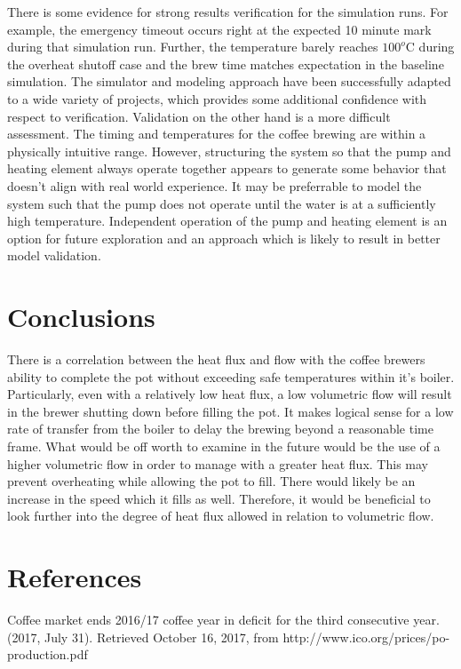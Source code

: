 \documentclass[10pt]{article}
\newcommand{\hin}{\hangindent=8mm \hangafter=1 \noindent }
\begin{document}
There is some evidence for strong results verification for the simulation runs.  For example, the emergency timeout occurs right at the expected 10 minute mark during that simulation run.  Further, the temperature barely reaches $100^o$C during the overheat shutoff case and the brew time matches expectation in the baseline simulation.  The simulator and modeling approach have been successfully adapted to a wide variety of projects, which provides some additional confidence with respect to verification.  Validation on the other hand is a more difficult assessment.  The timing and temperatures for the coffee brewing are within a physically intuitive range.  However, structuring the system so that the pump and heating element always operate together appears to generate some behavior that doesn't align with real world experience.  It may be preferrable to model the system such that the pump does not operate until the water is at a sufficiently high temperature.  Independent operation of the pump and heating element is an option for future exploration and an approach which is likely to result in better model validation.


\section{Conclusions}
There is a correlation between the heat flux and flow with the coffee brewers ability to
complete the pot without exceeding safe temperatures within it’s boiler. Particularly, even with a
relatively low heat flux, a low volumetric flow will result in the brewer shutting down before filling the
pot. It makes logical sense for a low rate of transfer from the boiler to delay the brewing beyond a
reasonable time frame. What would be off worth to examine in the future would be the use of a higher
volumetric flow in order to manage with a greater heat flux. This may prevent overheating while
allowing the pot to fill. There would likely be an increase in the speed which it fills as well. Therefore, it
would be beneficial to look further into the degree of heat flux allowed in relation to volumetric flow.

\newpage
\section{References}
\doublespace
\hin Coffee market ends 2016/17 coffee year in deficit for the third consecutive year. (2017, July 31). Retrieved October 16, 2017, from http://www.ico.org/prices/po-production.pdf
\end{document}
